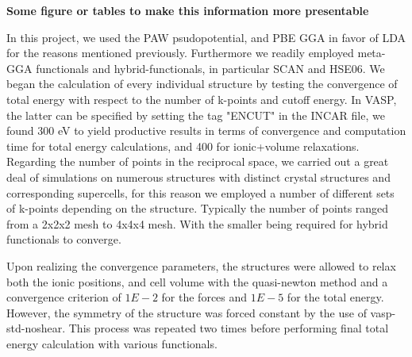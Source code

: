 \textbf{Some figure or tables to make this information more presentable}

In this project, we used the PAW psudopotential, and PBE GGA in favor of LDA for the reasons mentioned previously. Furthermore we readily employed meta-GGA functionals and hybrid-functionals, in particular SCAN and HSE06. We began the calculation of every individual structure by testing the convergence of total energy with respect to the number of k-points and cutoff energy. In VASP, the latter can be specified by setting the tag "ENCUT" in the INCAR file, we found 300 eV to yield productive results in terms of convergence and computation time for total energy calculations, and 400 for ionic+volume relaxations. Regarding the number of points in the reciprocal space, we carried out a great deal of simulations on numerous structures with distinct crystal structures and corresponding supercells, for this reason we employed a number of different sets of k-points depending on the structure. Typically the number of points ranged from a 2x2x2 mesh to 4x4x4 mesh. With the smaller being required for hybrid functionals to converge. 

Upon realizing the convergence parameters, the structures were allowed to relax both the ionic positions, and cell volume with the quasi-newton method and a convergence criterion of $1E-2$ for the forces and $1E-5$ for the total energy. However, the symmetry of the structure was forced constant by the use of vasp-std-noshear. This process was repeated two times before performing final total energy calculation with various functionals.

